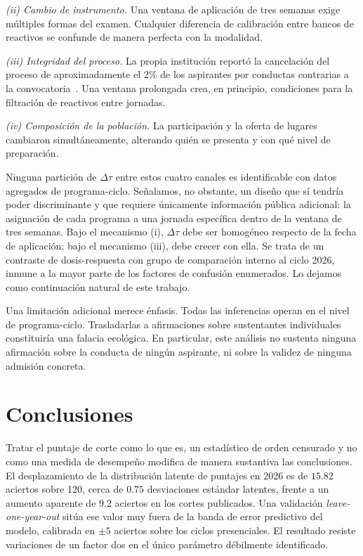 \documentclass[aps,prd,reprint,amsmath,amssymb,nofootinbib,superscriptaddress]{revtex4-2}
\begin{document}
\emph{(ii) Cambio de instrumento.} Una ventana de aplicaci\'on de tres
semanas exige m\'ultiples formas del examen. Cualquier diferencia de
calibraci\'on entre bancos de reactivos se confunde de manera perfecta con
la modalidad.

\emph{(iii) Integridad del proceso.} La propia instituci\'on report\'o la
cancelaci\'on del proceso de aproximadamente el $2\%$ de los aspirantes
por conductas contrarias a la convocatoria~\cite{gaceta2026}. Una ventana
prolongada crea, en principio, condiciones para la filtraci\'on de
reactivos entre jornadas.

\emph{(iv) Composici\'on de la poblaci\'on.} La participaci\'on y la
oferta de lugares cambiaron simult\'aneamente, alterando qui\'en se
presenta y con qu\'e nivel de preparaci\'on.

Ninguna partici\'on de $\Delta\tau$ entre estos cuatro canales es
identificable con datos agregados de programa-ciclo. Se\~nalamos, no
obstante, un dise\~no que s\'i tendr\'ia poder discriminante y que
requiere \'unicamente informaci\'on p\'ublica adicional: la asignaci\'on
de cada programa a una jornada espec\'ifica dentro de la ventana de tres
semanas. Bajo el mecanismo (i), $\Delta\tau$ debe ser homog\'eneo respecto
de la fecha de aplicaci\'on; bajo el mecanismo (iii), debe crecer con
ella. Se trata de un contraste de dosis-respuesta con grupo de
comparaci\'on interno al ciclo 2026, inmune a la mayor parte de los
factores de confusi\'on enumerados. Lo dejamos como continuaci\'on
natural de este trabajo.

Una limitaci\'on adicional merece \'enfasis. Todas las inferencias operan
en el nivel de programa-ciclo. Trasladarlas a afirmaciones sobre
sustentantes individuales constituir\'ia una falacia ecol\'ogica. En
particular, este an\'alisis no sustenta ninguna afirmaci\'on sobre la
conducta de ning\'un aspirante, ni sobre la validez de ninguna admisi\'on
concreta.

\section{Conclusiones}

Tratar el puntaje de corte como lo que es, un estad\'istico de orden
censurado y no como una medida de desempe\~no modifica de manera
sustantiva las conclusiones. El desplazamiento de la distribuci\'on
latente de puntajes en 2026 es de $15.82$ aciertos sobre 120, cerca de
$0.75$ desviaciones est\'andar latentes, frente a un aumento aparente de
$9.2$ aciertos en los cortes publicados. Una validaci\'on
\emph{leave-one-year-out} sit\'ua ese valor muy fuera de la banda de
error predictivo del modelo, calibrada en $\pm 5$ aciertos sobre los
ciclos presenciales. El resultado resiste variaciones de un factor dos en
el \'unico par\'ametro d\'ebilmente identificado.
\end{document}
